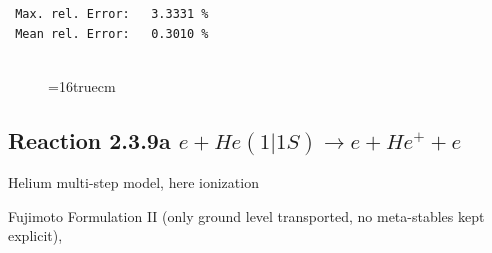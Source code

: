 \documentclass[12pt,dvips]{article}
\begin{document}
\begin{small}
\begin{verbatim}
 Max. rel. Error:   3.3331 %
 Mean rel. Error:   0.3010 %


\end{verbatim}\end{small}
\begin{figure} \label{2.2.14}
\epsfxsize=16truecm
\end{figure}
\newpage




\subsection{
Reaction 2.3.9a  $e + He(1|1S) \rightarrow  e + He^+ + e $
}
Helium multi-step model, here ionization

 Fujimoto Formulation II (only ground level transported, no meta-stables
 kept explicit), \cite{kn:Fujimoto}
\end{document}
